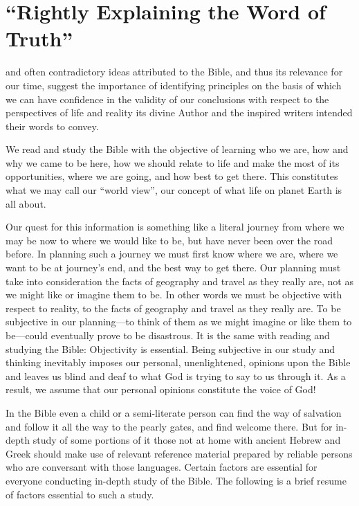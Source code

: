 \chapter{``Rightly Explaining the Word of Truth''}
\label{ch:rightly}

 and often contradictory ideas attributed to
the Bible, and thus its relevance for our time, suggest the importance of
identifying principles on the basis of which we can have confidence in the
validity of our conclusions with respect to the perspectives of life and
reality its divine Author and the inspired writers intended their words to
convey.

We read and study the Bible with the objective of learning who we are, how
and why we came to be here, how we should relate to life and make the most
of its opportunities, where we are going, and how best to get there. This
constitutes what we may call our ``world view'', our concept of what life on
planet Earth is all about.

Our quest for this information is something like a literal journey from
where we may be now to where we would like to be, but have never been over
the road before. In planning such a journey we must first know where we are,
where we want to be at journey's end, and the best way to get there. Our
planning must take into consideration the facts of geography and travel as
they really are, not as we might like or imagine them to be. In other words
we must be objective with respect to reality, to the facts of geography and
travel as they really are. To be subjective in our planning---to think of
them as we might imagine or like them to be---could eventually prove to be
disastrous. It is the same with reading and studying the Bible: Objectivity
is essential. Being subjective in our study and thinking inevitably imposes 
our personal, unenlightened, opinions upon the Bible and leaves us blind and
deaf to what God is trying to say to us through it. As a result, we assume
that our personal opinions constitute the voice of God!

In the Bible even a child or a semi-literate person can find the way of
salvation and follow it all the way to the pearly gates, and find welcome
there. But for in-depth study of some portions of it those not at home with
ancient Hebrew and Greek should make use of relevant reference material
prepared by reliable persons who are conversant with those languages.
Certain factors are essential for everyone conducting in-depth study of the
Bible. The following is a brief resume of factors essential to such a study.

